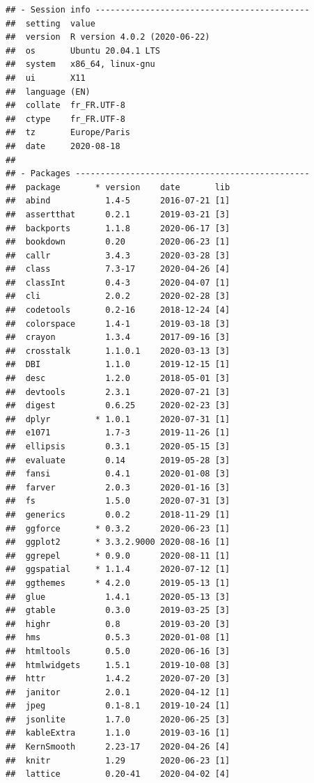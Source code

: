 \documentclass[
  french,
]{book}
\begin{document}
\begin{verbatim}
## - Session info -------------------------------------------
##  setting  value                       
##  version  R version 4.0.2 (2020-06-22)
##  os       Ubuntu 20.04.1 LTS          
##  system   x86_64, linux-gnu           
##  ui       X11                         
##  language (EN)                        
##  collate  fr_FR.UTF-8                 
##  ctype    fr_FR.UTF-8                 
##  tz       Europe/Paris                
##  date     2020-08-18                  
## 
## - Packages -----------------------------------------------
##  package       * version    date       lib
##  abind           1.4-5      2016-07-21 [1]
##  assertthat      0.2.1      2019-03-21 [3]
##  backports       1.1.8      2020-06-17 [3]
##  bookdown        0.20       2020-06-23 [1]
##  callr           3.4.3      2020-03-28 [3]
##  class           7.3-17     2020-04-26 [4]
##  classInt        0.4-3      2020-04-07 [1]
##  cli             2.0.2      2020-02-28 [3]
##  codetools       0.2-16     2018-12-24 [4]
##  colorspace      1.4-1      2019-03-18 [3]
##  crayon          1.3.4      2017-09-16 [3]
##  crosstalk       1.1.0.1    2020-03-13 [3]
##  DBI             1.1.0      2019-12-15 [1]
##  desc            1.2.0      2018-05-01 [3]
##  devtools        2.3.1      2020-07-21 [3]
##  digest          0.6.25     2020-02-23 [3]
##  dplyr         * 1.0.1      2020-07-31 [1]
##  e1071           1.7-3      2019-11-26 [1]
##  ellipsis        0.3.1      2020-05-15 [3]
##  evaluate        0.14       2019-05-28 [3]
##  fansi           0.4.1      2020-01-08 [3]
##  farver          2.0.3      2020-01-16 [3]
##  fs              1.5.0      2020-07-31 [3]
##  generics        0.0.2      2018-11-29 [1]
##  ggforce       * 0.3.2      2020-06-23 [1]
##  ggplot2       * 3.3.2.9000 2020-08-16 [1]
##  ggrepel       * 0.9.0      2020-08-11 [1]
##  ggspatial     * 1.1.4      2020-07-12 [1]
##  ggthemes      * 4.2.0      2019-05-13 [1]
##  glue            1.4.1      2020-05-13 [3]
##  gtable          0.3.0      2019-03-25 [3]
##  highr           0.8        2019-03-20 [3]
##  hms             0.5.3      2020-01-08 [1]
##  htmltools       0.5.0      2020-06-16 [3]
##  htmlwidgets     1.5.1      2019-10-08 [3]
##  httr            1.4.2      2020-07-20 [3]
##  janitor         2.0.1      2020-04-12 [1]
##  jpeg            0.1-8.1    2019-10-24 [1]
##  jsonlite        1.7.0      2020-06-25 [3]
##  kableExtra      1.1.0      2019-03-16 [1]
##  KernSmooth      2.23-17    2020-04-26 [4]
##  knitr           1.29       2020-06-23 [1]
##  lattice         0.20-41    2020-04-02 [4]

\end{verbatim}
\end{document}
